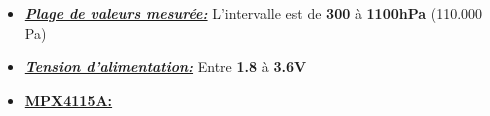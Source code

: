 \documentclass[a4paper,12pt]{report}
\begin{document}
\vspace{3cm}
\hfill

\begin{itemize}
\vspace{2cm}
\setlength{\itemindent}{2cm}
\item \underline{\textit{\textbf{Plage de valeurs mesurée:}}} L'intervalle est de \textbf{300} à \textbf{1100hPa} (110.000 Pa)
\end{itemize} 

\begin{itemize}
\setlength{\itemindent}{2cm}
\item \underline{\textit{\textbf{Tension d'alimentation:}}} Entre \textbf{1.8} à \textbf{3.6V} 
\end{itemize} 

\vspace{1cm}

\begin{itemize} 
\setlength{\itemindent}{1cm}
 \item \underline{\textbf{MPX4115A:}}
\end{itemize}
\end{document}
